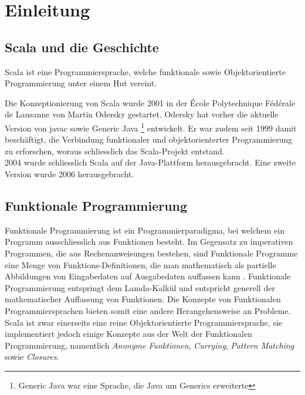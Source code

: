 \chapter{Einleitung}

\section{Scala und die Geschichte}

Scala ist eine Programmiersprache, welche funktionale sowie 
Objektorientierte Programmierung unter einem Hut vereint.

Die Konzeptionierung von Scala wurde 2001 in der École Polytechnique
Fédérale de Lausanne von Martin Odersky gestartet. Odersky hat
vorher die aktuelle Version von javac sowie Generic Java 
\footnote{Generic Java war eine Sprache, die Java um Generics erweiterte}
entwickelt. Er war zudem seit 1999 damit beschäftigt, die Verbindung
funktionaler und objektorienterter Programmierung zu erforschen, woraus
schliesslich das Scala-Projekt entstand. \\

2004 wurde schliesslich Scala auf der Java-Plattform herausgebracht. Eine
zweite Version wurde 2006 herausgebracht.

\section{Funktionale Programmierung}

Funktionale Programmierung ist ein Programmierparadigma, bei welchem
ein Programm ausschliesslich aus Funktionen besteht. Im Gegensatz
zu imperativen Programmen, die aus Rechenanweisungen bestehen, sind
Funktionale Programme eine Menge von Funktions-Definitionen, die man
mathematisch als partielle Abbildungen von Eingabedaten auf Ausgabedaten
auffassen kann \cite{wikipediaFunktional}. Funktionale Programmierung
entspringt dem Lamda-Kalkül und entspricht generell der mathematischer
Auffassung von Funktionen. Die Konzepte von Funktionalen
Programmiersprachen bieten somit eine andere Herangehensweise an Probleme.\\

Scala ist zwar einerseits eine reine Objektorientierte Programmiersprache,
sie implementiert jedoch einige Konzepte aus der Welt der Funktionalen
Programmierung, namentlich \emph{Anonyme Funktionen}, \emph{Currying},
\emph{Pattern Matching} sowie \emph{Closures}.

